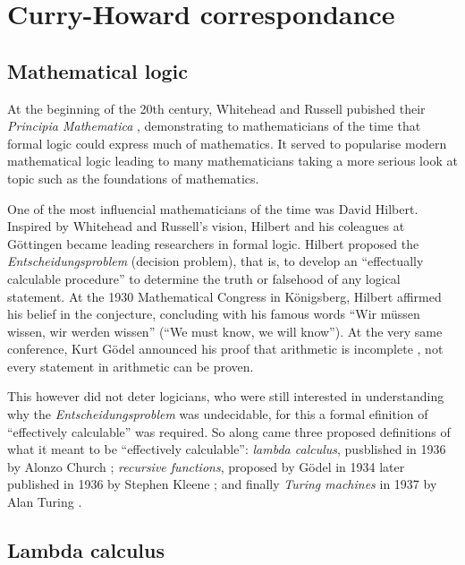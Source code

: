 \section{Curry-Howard correspondance}

\subsection{Mathematical logic}

At the beginning of the 20th century, Whitehead and Russell pubished their \emph{Principia Mathematica} \cite{GlossarWiki:Whitehead_Russell:1910}, demonstrating to mathematicians of the time that formal logic could express much of mathematics. It served to popularise modern mathematical logic leading to many mathematicians taking a more serious look at topic such as the foundations of mathematics.

One of the most influencial mathematicians of the time was David Hilbert. Inspired by Whitehead and Russell's vision, Hilbert and his coleagues at G\"ottingen became leading researchers in formal logic. Hilbert proposed the \emph{Entscheidungsproblem} (decision problem), that is, to develop an ``effectually calculable procedure'' to determine the truth or falsehood of any logical statement. At the 1930 Mathematical Congress in K\"onigsberg, Hilbert affirmed his belief in the conjecture, concluding with his famous words ``Wir m\"ussen wissen, wir werden wissen'' (``We must know, we will know''). At the very same conference, Kurt G\"odel announced his proof that arithmetic is incomplete \cite{GlossarWiki:Goedel:1931}, not every statement in arithmetic can be proven.

This however did not deter logicians, who were still interested in understanding why the \emph{Entscheidungsproblem} was undecidable, for this a formal efinition of ``effectively calculable'' was required. So along came three proposed definitions of what it meant to be ``effectively calculable'': \emph{lambda calculus}, pusblished in 1936 by Alonzo Church \cite{church-unsolvableproblemof-1936}; \emph{recursive functions}, proposed by G\"odel in 1934 later published in 1936 by Stephen Kleene \cite{Kleene1936}; and finally \emph{Turing machines} in 1937 by Alan Turing \cite{turing1936a}.

\subsection{Lambda calculus}

